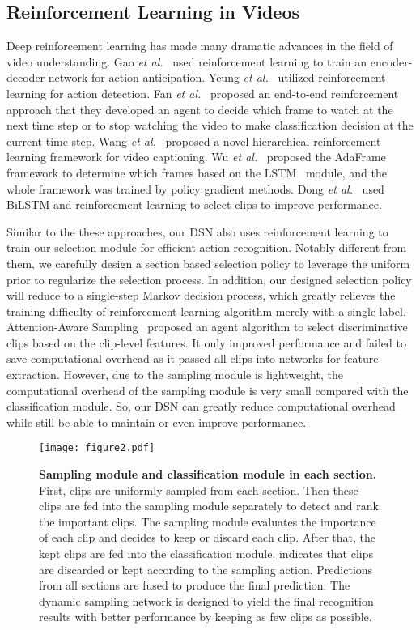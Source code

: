 \documentclass[journal]{IEEEtran}
\begin{document}
\subsection{Reinforcement Learning in Videos}
Deep reinforcement learning has made many dramatic advances in the field of video understanding.
Gao \emph{et al.}~\cite{GaoYN17a} used reinforcement learning to train an encoder-decoder network for action anticipation.
Yeung \emph{et al.}~\cite{YeungRMF16} utilized reinforcement learning for action detection.
Fan \emph{et al.}~\cite{ FanXZYGY18} proposed an end-to-end reinforcement approach that they developed an agent to decide which frame to watch at the next time step or to stop watching the video to make classification decision at the current time step.
Wang \emph{et al.}~\cite{WangCWWW18} proposed a novel hierarchical reinforcement learning framework for video captioning. Wu \emph{et al.}~\cite{AdaFrame} proposed the AdaFrame framework to determine which frames based on the LSTM~\cite{lstm} module, and the whole framework was trained by policy gradient methods.
Dong \emph{et al.}~\cite{DongZT19} used BiLSTM and reinforcement learning to select clips to improve performance.

Similar to the these approaches, our DSN also uses reinforcement learning to train our selection module for efficient action recognition.
Notably different from them, we carefully design a section based selection policy to leverage the uniform prior to regularize the selection process. In addition, our designed selection policy will reduce to a single-step Markov decision process, which greatly relieves the training difficulty of reinforcement learning algorithm merely with a single label.
Attention-Aware Sampling~\cite{DongZT19} proposed an agent algorithm to select discriminative clips based on the clip-level features. It only improved performance and failed to save computational overhead as it passed all clips into networks for feature extraction.
However, due to the sampling module is lightweight, the computational overhead of the sampling module is very small compared with the classification module. So, our DSN can greatly reduce computational overhead while still be able to maintain or even improve performance.

\begin{figure*}[t]
  \centering
  \texttt{[image: figure2.pdf]}
  \caption{\textbf{Sampling module and classification module in each section.} First,  clips are uniformly sampled from each section. Then these clips are fed into the sampling module separately to detect and rank the important clips. The sampling module evaluates the importance of each clip and decides to keep or discard each clip. After that, the kept clips are fed into the classification module.  indicates that clips are discarded or kept according to the sampling action. Predictions from all sections are fused to produce the final prediction. The dynamic sampling network is designed to yield the final recognition results with better performance by keeping as few clips as possible.}
  \label{fig:arch}
\end{figure*}
\end{document}

